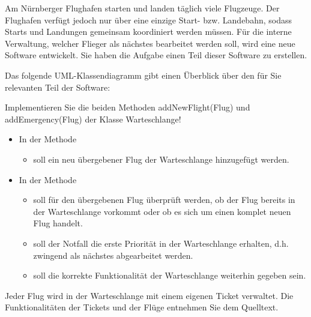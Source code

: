 \documentclass{lehramt-informatik}
\begin{document}
Am Nürnberger Flughafen starten und landen täglich viele Flugzeuge. Der
Flughafen verfügt jedoch nur über eine einzige Start- bzw. Landebahn,
sodass Starts und Landungen gemeinsam koordiniert werden müssen. Für die
interne Verwaltung, welcher Flieger als nächstes bearbeitet werden soll,
wird eine neue Software entwickelt. Sie haben die Aufgabe einen Teil
dieser Software zu erstellen.

Das folgende UML-Klassendiagramm gibt einen Überblick über den für Sie
relevanten Teil der Software:

Implementieren Sie die beiden Methoden addNewFlight(Flug) und
addEmergency(Flug) der Klasse Warteschlange!

\begin{itemize}
\item In der Methode 

\begin{itemize}
\item soll ein neu übergebener Flug der Warteschlange hinzugefügt werden.
\end{itemize}

\item  In der Methode 

\begin{itemize}
\item soll für den übergebenen Flug überprüft werden, ob der Flug
bereits in der Warteschlange vorkommt oder ob es sich um einen komplet
neuen Flug handelt.

\item soll der Notfall die erste Priorität in der Warteschlange
erhalten, d.h. zwingend als nächstes abgearbeitet werden.

\item soll die korrekte Funktionalität der Warteschlange weiterhin
gegeben sein.
\end{itemize}
\end{itemize}

Jeder Flug wird in der Warteschlange mit einem eigenen Ticket verwaltet.
Die Funktionalitäten der Tickets und der Flüge entnehmen Sie dem
Quelltext.

\begin{antwort}





\end{antwort}

\literatur
\end{document}
